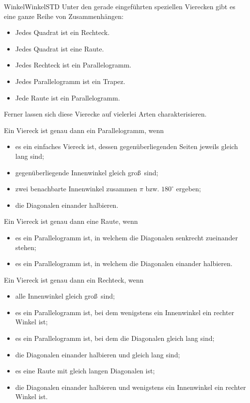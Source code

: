 \begin{MXContent}{Winkel}{Winkel}{STD}
Unter den gerade eingef\"uhrten speziellen Vierecken gibt es eine ganze Reihe von Zusammenh\"angen:

\begin{MInfo}%
\begin{itemize}
 \item Jedes Quadrat ist ein Rechteck.
\item Jedes Quadrat ist eine Raute.
\item Jedes Rechteck ist ein Parallelogramm.
\item Jedes Parallelogramm ist ein Trapez.
\item Jede Raute ist ein Parallelogramm.
\end{itemize}
\end{MInfo}

Ferner lassen sich diese Vierecke auf vielerlei Arten charakterisieren.

\begin{MInfo}%
Ein Viereck ist genau dann ein Parallelogramm, wenn
\begin{itemize}
 \item es ein einfaches Viereck ist, dessen gegen\"uberliegenden Seiten jeweils gleich lang sind;
\item gegen\"uberliegende Innenwinkel gleich gro\ss\ sind;
\item zwei benachbarte Innenwinkel zusammen $\pi$ bzw. $180^\circ$ ergeben; 
\item die Diagonalen einander halbieren.
\end{itemize}
\end{MInfo}


\begin{MInfo}%
Ein Viereck ist genau dann eine Raute, wenn
\begin{itemize}
 \item es ein Parallelogramm ist, in welchem die Diagonalen senkrecht zueinander stehen;
 \item es ein Parallelogramm ist, in welchem die Diagonalen einander halbieren.
\end{itemize}
\end{MInfo}


\begin{MInfo}%
Ein Viereck ist genau dann ein Rechteck, wenn
\begin{itemize}
 \item alle Innenwinkel gleich gro\ss\ sind;
\item es ein Parallelogramm ist, bei dem wenigstens ein Innenwinkel ein rechter Winkel ist;
\item es ein Parallelogramm ist, bei dem die Diagonalen gleich lang sind; 
\item die Diagonalen einander halbieren und gleich lang sind;
\item es eine Raute mit gleich langen Diagonalen ist;
\item die Diagonalen einander halbieren und wenigstens ein Innenwinkel ein rechter Winkel ist.
\end{itemize}
\end{MInfo}



\end{MXContent}
